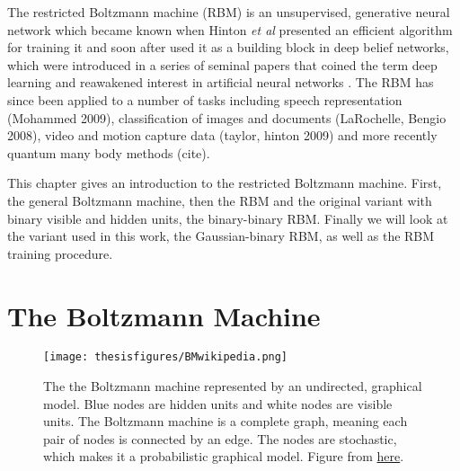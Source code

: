 \documentclass[twoside,english]{uiofysmaster}
\begin{document}
The restricted Boltzmann machine (RBM) is an unsupervised, generative neural network which became known when Hinton \textit{et al} presented an efficient algorithm for training it \cite{Hinton2002} and soon after used it as a building block in deep belief networks, which were introduced in a series of seminal papers that coined the term deep learning and reawakened interest in artificial neural networks \cite{Hinton2006a} \cite{Hinton2006} \cite{Hinton2007}. The RBM has since been applied to a number of tasks including speech representation (Mohammed 2009), classification of images and documents (LaRochelle, Bengio 2008), video and motion capture data (taylor, hinton 2009) and more recently quantum many body methods (cite).

This chapter gives an introduction to the restricted Boltzmann machine. First, the general Boltzmann machine, then the RBM and the original variant with binary visible and hidden units, the binary-binary RBM. Finally we will look at the variant used in this work, the Gaussian-binary RBM, as well as the RBM training procedure.










\section{The Boltzmann Machine}
\label{sec:BM}


\begin{figure}
\centering
 \texttt{[image: thesisfigures/BMwikipedia.png]}
 \caption{The the Boltzmann machine represented by an undirected, graphical model. Blue nodes are hidden units and white nodes are visible units. The Boltzmann machine is a complete graph, meaning each pair of nodes is connected by an edge. The nodes are stochastic, which makes it a probabilistic graphical model. Figure from \href{https://en.wikipedia.org/wiki/Boltzmann_machine}{here}.}
 \label{fig:BMwikipedia}
\end{figure}
\end{document}
